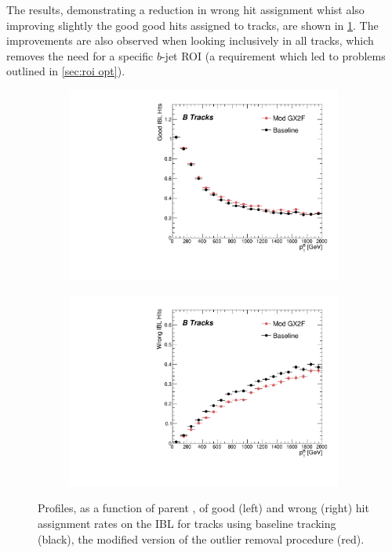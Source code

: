 The results, demonstrating a reduction in wrong hit assignment whist also improving slightly the good good hits assigned to tracks, are shown in \cref{fig:gx2f_opt_hits}. The improvements are also observed when looking inclusively in all tracks, which removes the need for a specific $b$-jet ROI (a requirement which led to problems outlined in \cref{sec:roi opt}).
%
\begin{figure}[!htbp]
    \centering
    \begin{subfigure}{.48\textwidth}
      \centering
      \includegraphics[width=\textwidth]{chapters/3.tracking/figs/p_nGoodHitsIBL_pTB_From_B.pdf}
    \end{subfigure}%
    \begin{subfigure}{.48\textwidth}
      \centering
      \includegraphics[width=\textwidth]{chapters/3.tracking/figs/p_nWrongHitsIBL_pTB_From_B.pdf}
    \end{subfigure}
    \caption{Profiles, as a function of parent \bhadron \pt, of good (left) and wrong (right) hit assignment rates on the IBL for tracks using baseline tracking (black), the modified version of the outlier removal procedure (red).}
    \label{fig:gx2f_opt_hits}
\end{figure}
